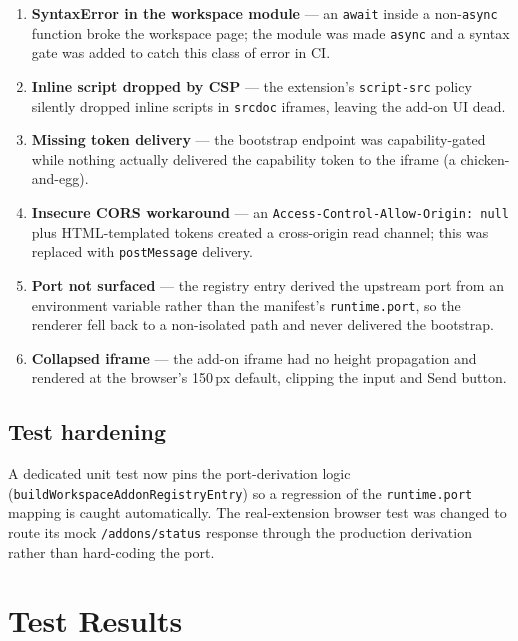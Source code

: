 \documentclass[11pt]{article}
\begin{document}
\begin{enumerate}[leftmargin=1.5em]
  \item \textbf{SyntaxError in the workspace module} --- an \texttt{await}
        inside a non-\texttt{async} function broke the workspace page; the
        module was made \texttt{async} and a syntax gate was added to catch
        this class of error in CI.
  \item \textbf{Inline script dropped by CSP} --- the extension's
        \texttt{script-src} policy silently dropped inline scripts in
        \texttt{srcdoc} iframes, leaving the add-on UI dead.
  \item \textbf{Missing token delivery} --- the bootstrap endpoint was
        capability-gated while nothing actually delivered the capability token
        to the iframe (a chicken-and-egg).
  \item \textbf{Insecure CORS workaround} --- an
        \texttt{Access-Control-Allow-Origin: null} plus HTML-templated tokens
        created a cross-origin read channel; this was replaced with
        \texttt{postMessage} delivery.
  \item \textbf{Port not surfaced} --- the registry entry derived the upstream
        port from an environment variable rather than the manifest's
        \texttt{runtime.port}, so the renderer fell back to a non-isolated path
        and never delivered the bootstrap.
  \item \textbf{Collapsed iframe} --- the add-on iframe had no height
        propagation and rendered at the browser's 150\,px default, clipping the
        input and Send button.
\end{enumerate}

\subsection{Test hardening}

A dedicated unit test now pins the port-derivation logic
(\texttt{buildWorkspaceAddonRegistryEntry}) so a regression of the
\texttt{runtime.port} mapping is caught automatically. The real-extension
browser test was changed to route its mock \texttt{/addons/status} response
through the production derivation rather than hard-coding the port.

\section{Test Results}
\end{document}

